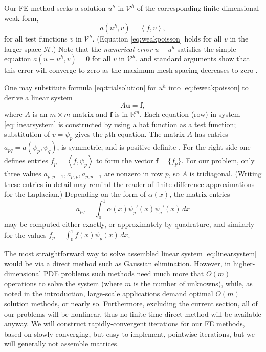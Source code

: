 \documentclass[letterpaper,final,12pt,reqno]{amsart}
\theoremstyle{claim}
\newcommand{\RR}{\mathbb{R}}
\newcommand{\bbf}{\mathbf{f}}
\newcommand{\bu}{\mathbf{u}}
\newcommand{\ip}[2]{\left<#1,#2\right>}
\numberwithin{equation}{section}
\numberwithin{figure}{section}
\numberwithin{table}{section}
\begin{document}
Our FE method seeks a solution $u^h$ in $\mathcal{V}^h$ of the corresponding finite-dimensional weak-form,
\begin{equation}
  a(u^h,v) = \ip{f}{v},  \label{eq:feweakpoisson}
\end{equation}
for all test functions $v$ in $\mathcal{V}^h$.  (Equation \eqref{eq:weakpoisson} holds for all $v$ in the larger space $\mathcal{H}$.)  Note that the \emph{numerical error} $u-u^h$ satisfies the simple equation $a(u-u^h,v)=0$ for all $v$ in $\mathcal{V}^h$, and standard arguments show that this error will converge to zero as the maximum mesh spacing decreases to zero \cite{Elmanetal2014}.

One may substitute formula \eqref{eq:trialsolution} for $u^h$ into \eqref{eq:feweakpoisson} to derive a linear system
\begin{equation}
A \bu = \bbf, \label{eq:linearsystem}
\end{equation}
where $A$ is an $m\times m$ matrix and $\bbf$ is in $\RR^m$.  Each equation (row) in system \eqref{eq:linearsystem} is constructed by using a hat function as a test function; substitution of $v=\psi_p$ gives the $p$th equation.  The matrix $A$ has entries $a_{pq} = a(\psi_p,\psi_q)$, is symmetric, and is positive definite \cite{Elmanetal2014}.  For the right side one defines entries $f_p = \ip{f}{\psi_p}$ to form the vector $\bbf = \{f_p\}$.  For our problem, only three values $a_{p,p-1}, a_{p,p}, a_{p,p+1}$ are nonzero in row $p$, so $A$ is tridiagonal.  (Writing these entries in detail may remind the reader of finite difference approximations for the Laplacian.)  Depending on the form of $\alpha(x)$, the matrix entries
\begin{equation}
  a_{pq} = \int_0^1 \alpha(x) \psi_p'(x) \psi_q'(x)\,dx \label{eq:poissonentries}
\end{equation}
may be computed either exactly, or approximately by quadrature, and similarly for the values $f_p = \int_0^1 f(x) \psi_p(x)\,dx$.

The most straightforward way to solve assembled linear system \eqref{eq:linearsystem} would be via a direct method such as Gaussian elimination.  However, in higher-dimensional PDE problems such methods need much more that $O(m)$ operations to solve the system (where $m$ is the number of unknowns), while, as noted in the introduction, large-scale applications demand optimal $O(m)$ solution methods, or nearly so.  Furthermore, excluding the current section, all of our problems will be nonlinear, thus no finite-time direct method will be available anyway.  We will construct rapidly-convergent iterations for our FE methods, based on slowly-converging, but easy to implement, pointwise iterations, but we will generally not assemble matrices.
\end{document}
